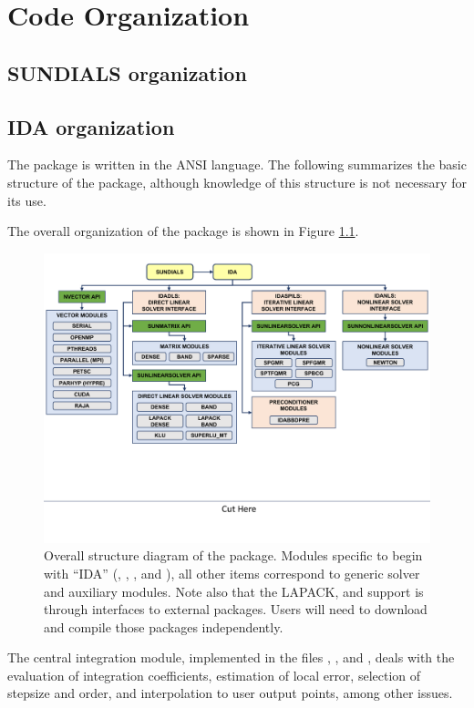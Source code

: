 \chapter{Code Organization}\label{s:organization}

\section{SUNDIALS organization}\label{ss:sun_org}


\section{IDA organization}\label{ss:ida_org}

The {\ida} package is written in the ANSI {\CC} language. The following
summarizes the basic structure of the package, although knowledge
of this structure is not necessary for its use.

The overall organization of the {\ida} package is shown in Figure
\ref{f:idaorg}.
\begin{figure}
{\centerline{\includegraphics[width=\textwidth]{idaorg}}}
\caption [Overall structure diagram of the {\ida} package]
{Overall structure diagram of the {\ida} package.
  Modules specific to {\ida} begin with ``IDA'' ({\idadls},
  {\idaspils}, {\idabbdpre}, and {\idanls}), all other items correspond
  to generic solver and auxiliary modules. 
  Note also that the LAPACK, {\klu} and {\superlumt} support is
  through interfaces to external packages. 
  Users will need to download and compile those packages independently.}
\label{f:idaorg}
\end{figure}
The central integration module, implemented in the files ,
, and , deals with the evaluation of integration 
coefficients, estimation of local error,
selection of stepsize and order, and interpolation to user output
points, among other issues.

